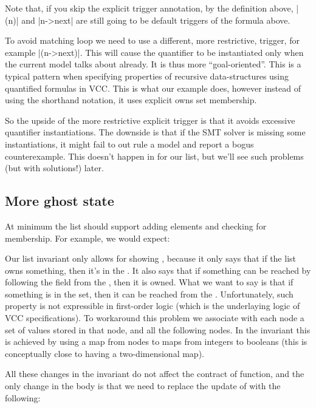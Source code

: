 Note that, if you skip the explicit trigger annotation, by the definition
above, \vcc|{\mine(n)}| and \vcc|n->next| are still going to be default
triggers of the formula above.

To avoid matching loop we need to use a different, more restrictive,
trigger, for example \vcc|{\mine(n->next)}|.
This will cause the quantifier to be instantiated only when the current
model talks about  already.
It is thus more ``goal-oriented''.
This is a typical pattern when specifying properties of recursive data-structures
using quantified formulas in VCC.
This is what our example does, however instead of using the shorthand
notation, it uses explicit owns set membership.

So the upside of the more restrictive explicit trigger is that it avoids
excessive quantifier instantiations.
The downside is that if the SMT solver is missing some instantiations,
it might fail to out rule a model and report a bogus counterexample.
This doesn't happen in for our list, but we'll see such problems
(but with solutions!) later.

\subsection{More ghost state}

At minimum the list should support adding elements and checking
for membership. For example, we would expect:


\noindent
Our list invariant only allows for showing
, because it only says
that if the list owns something, then it's in the .
It also says that if something can be reached by following
the  field from the , then it is owned.
What we want to say is that if something is in the 
set, then it can be reached from the .
Unfortunately, such property is not expressible in first-order
logic (which is the underlaying logic of VCC specifications).
To workaround this problem we associate with each node
a set of values stored in that node, and all the following nodes.
In the invariant this is achieved by using a map from nodes
to maps from integers to booleans (this is conceptually close
to having a two-dimensional map).


\noindent
{}
All these changes in the invariant do not affect
the contract of  function, and the only change in the body
is that we need to replace the update of  with the following:

